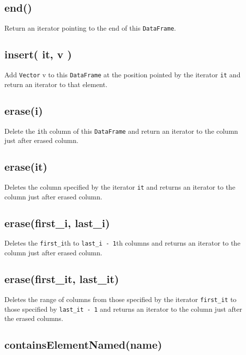 \documentclass[]{book}
\theoremstyle{definition}
\theoremstyle{definition}
\theoremstyle{remark}
\begin{document}
\subsection{end()}\label{end-1}

Return an iterator pointing to the end of this \texttt{DataFrame}.

\subsection{insert( it, v )}\label{insert-it-v}

Add \texttt{Vector} v to this \texttt{DataFrame} at the position pointed
by the iterator \texttt{it} and return an iterator to that element.

\subsection{erase(i)}\label{erasei-1}

Delete the \texttt{i}th column of this \texttt{DataFrame} and return an
iterator to the column just after erased column.

\subsection{erase(it)}\label{eraseit-1}

Deletes the column specified by the iterator \texttt{it} and returns an
iterator to the column just after erased column.

\subsection{erase(first\_i, last\_i)}\label{erasefirst_i-last_i}

Deletes the \texttt{first\_i}th to \texttt{last\_i\ -\ 1}th columns and
returns an iterator to the column just after erased column.

\subsection{erase(first\_it, last\_it)}\label{erasefirst_it-last_it}

Deletes the range of columns from those specified by the iterator
\texttt{first\_it} to those specified by \texttt{last\_it\ -\ 1} and
returns an iterator to the column just after the erased columns.

\subsection{containsElementNamed(name)}\label{containselementnamedname-1}
\end{document}
